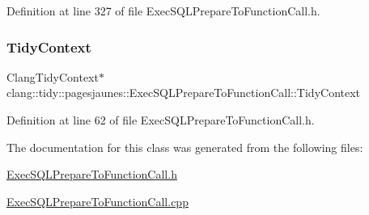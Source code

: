 Definition at line 327 of file Exec\+S\+Q\+L\+Prepare\+To\+Function\+Call.\+h.

\mbox{\label{classclang_1_1tidy_1_1pagesjaunes_1_1_exec_s_q_l_prepare_to_function_call_ade8961a6f1568823b03d01310daf9cb8}} 
\subsubsection{\texorpdfstring{Tidy\+Context}{TidyContext}}
{\footnotesize\ttfamily Clang\+Tidy\+Context$\ast$ clang\+::tidy\+::pagesjaunes\+::\+Exec\+S\+Q\+L\+Prepare\+To\+Function\+Call\+::\+Tidy\+Context}



Definition at line 62 of file Exec\+S\+Q\+L\+Prepare\+To\+Function\+Call.\+h.



The documentation for this class was generated from the following files\+:\begin{DoxyCompactItemize}
\item 
\hyperlink{_exec_s_q_l_prepare_to_function_call_8h}{Exec\+S\+Q\+L\+Prepare\+To\+Function\+Call.\+h}\item 
\hyperlink{_exec_s_q_l_prepare_to_function_call_8cpp}{Exec\+S\+Q\+L\+Prepare\+To\+Function\+Call.\+cpp}\end{DoxyCompactItemize}
